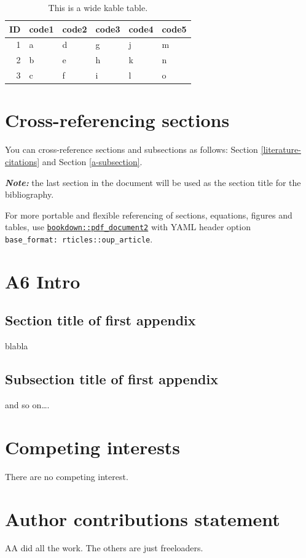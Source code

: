 \documentclass[webpdf,large,contemporary,namedate]{oup-authoring-template}
\theoremstyle{thmstyleone}
\theoremstyle{thmstyletwo}
\theoremstyle{thmstylethree}
\begin{document}
\begin{table}

\caption{\label{tab:tab3}This is a wide kable table.}
\centering
\begin{tabular}[t]{rlllll}
\toprule
ID & code1 & code2 & code3 & code4 & code5\\
\midrule
1 & a & d & g & j & m\\
2 & b & e & h & k & n\\
3 & c & f & i & l & o\\
\bottomrule
\end{tabular}
\end{table}

\hypertarget{cross-referencing-sections}{%
\section{Cross-referencing sections}\label{cross-referencing-sections}}

You can cross-reference sections and subsections as follows: Section
\ref{literature-citations} and Section \ref{a-subsection}.

\textbf{\emph{Note:}} the last section in the document will be used as
the section title for the bibliography.

For more portable and flexible referencing of sections, equations,
figures and tables, use
\href{https://github.com/rstudio/bookdown}{\texttt{bookdown::pdf\_document2}}
with YAML header option \texttt{base\_format:\ rticles::oup\_article}.

\hypertarget{a6-intro}{%
\section{A6 Intro}\label{a6-intro}}

\begin{appendices}

\hypertarget{section-title-of-first-appendix}{%
\section{Section title of first
appendix}\label{section-title-of-first-appendix}}

blabla

\hypertarget{subsection-title-of-first-appendix}{%
\subsection{Subsection title of first
appendix}\label{subsection-title-of-first-appendix}}

and so on\ldots.

\end{appendices}

\section{Competing interests}

There are no competing interest.

\section{Author contributions statement}

AA did all the work. The others are just freeloaders.


\renewcommand\refname{References}




\end{document}
